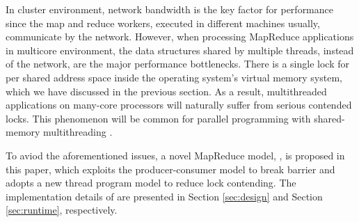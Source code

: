 In cluster environment, network bandwidth is the key factor for performance since the map and reduce workers, executed in different machines usually, communicate by the network.
However, when processing MapReduce applications in multicore environment, the data structures shared by multiple threads, instead of the network, are the major performance bottlenecks.
There is a single lock for per shared address space inside the operating system’s virtual memory system, which we have discussed in the previous section. 
As a result, multithreaded applications on many-core processors will naturally suffer from serious contended locks.
This phenomenon will be common for parallel programming with shared-memory multithreading \cite{clements2013radixvm}.




To aviod the aforementioned issues, a novel MapReduce model, \myds,  is proposed in this paper,
which exploits the producer-consumer model to break barrier and adopts a new thread program model to reduce lock contending.
The implementation details of \myds are presented in Section \ref{sec:design} and Section \ref{sec:runtime}, respectively.  








